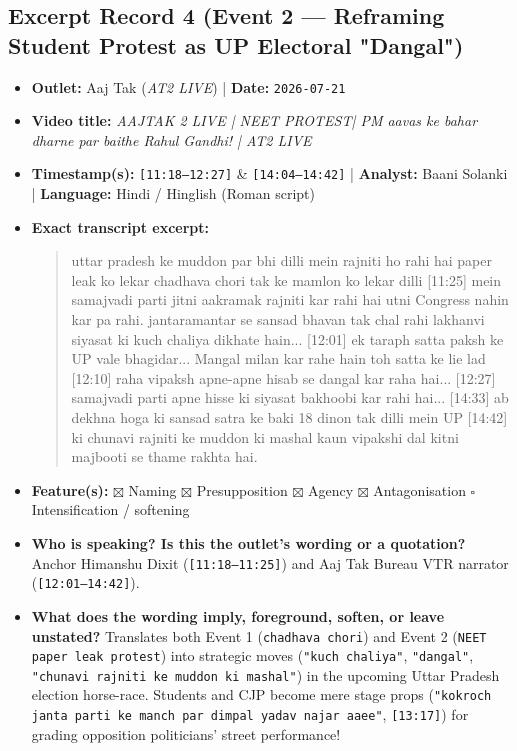 \documentclass[10pt,a4paper]{article}
\begin{document}
\subsection*{Excerpt Record 4 (Event 2 --- Reframing Student Protest as UP Electoral "Dangal")}
\begin{itemize}[leftmargin=1.5em, itemsep=3pt, topsep=4pt]
  \item \textbf{Outlet:} Aaj Tak (\textit{AT2 LIVE}) | \textbf{Date:} \texttt{2026-07-21}
  \item \textbf{Video title:} \textit{AAJTAK 2 LIVE | NEET PROTEST| PM aavas ke bahar dharne par baithe Rahul Gandhi! | AT2 LIVE}
  \item \textbf{Timestamp(s):} \texttt{[11:18--12:27]} \& \texttt{[14:04--14:42]} | \textbf{Analyst:} Baani Solanki | \textbf{Language:} Hindi / Hinglish (Roman script)
  \item \textbf{Exact transcript excerpt:}
    \begin{quote}\small\ttfamily [11:18] uttar pradesh ke muddon par bhi dilli mein rajniti ho rahi hai paper leak ko lekar chadhava chori tak ke mamlon ko lekar dilli [11:25] mein samajvadi parti jitni aakramak rajniti kar rahi hai utni Congress nahin kar pa rahi. jantaramantar se sansad bhavan tak chal rahi lakhanvi siyasat ki kuch chaliya dikhate hain... [12:01] ek taraph satta paksh ke UP vale bhagidar... Mangal milan kar rahe hain toh satta ke lie lad [12:10] raha vipaksh apne-apne hisab se dangal kar raha hai... [12:27] samajvadi parti apne hisse ki siyasat bakhoobi kar rahi hai... [14:33] ab dekhna hoga ki sansad satra ke baki 18 dinon tak dilli mein UP [14:42] ki chunavi rajniti ke muddon ki mashal kaun vipakshi dal kitni majbooti se thame rakhta hai.\end{quote}
  \item \textbf{Feature(s):} $\boxtimes$ Naming $\boxtimes$ Presupposition $\boxtimes$ Agency $\boxtimes$ Antagonisation $\square$ Intensification / softening
  \item \textbf{Who is speaking? Is this the outlet's wording or a quotation?} Anchor Himanshu Dixit (\texttt{[11:18--11:25]}) and Aaj Tak Bureau VTR narrator (\texttt{[12:01--14:42]}).
  \item \textbf{What does the wording imply, foreground, soften, or leave unstated?} Translates both Event 1 (\texttt{chadhava chori}) and Event 2 (\texttt{NEET paper leak protest}) into strategic moves (\texttt{"kuch chaliya"}, \texttt{"dangal"}, \texttt{"chunavi rajniti ke muddon ki mashal"}) in the upcoming Uttar Pradesh election horse-race. Students and CJP become mere stage props (\texttt{"kokroch janta parti ke manch par dimpal yadav najar aaee"}, \texttt{[13:17]}) for grading opposition politicians' street performance!

\end{itemize}
\end{document}
